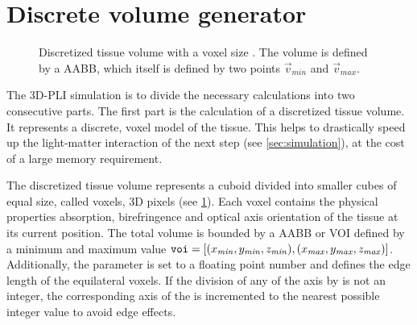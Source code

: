 \section{Discrete volume generator}
\label{sec:dv_generator}
%
\begin{figure}[!t]
\centering
\setlength{\tikzwidth}{0.5\textwidth}
\caption{Discretized tissue volume with a voxel size \voxelsize. The volume is defined by a \ac{AABB}, which itself is defined by two points $\vec{v}_\mathit{min}$ and $\vec{v}_\mathit{max}$.}
\label{fig:discVol}
\end{figure}
%
The \ac{3D-PLI} simulation is to divide the necessary calculations into two consecutive parts. The first part is the calculation of a discretized tissue volume.
It represents a discrete, voxel model of the tissue.
This helps to drastically speed up the light-matter interaction of the next step (see \cref{sec:simulation}), at the cost of a large memory requirement.
\par
%
The discretized tissue volume represents a cuboid divided into smaller cubes of equal size, called voxels, \ie{} 3D pixels (see \cref{fig:discVol}).
Each voxel contains the physical properties absorption, birefringence and optical axis orientation of the tissue at its current position.
The total volume is bounded by a \ac{AABB} or \ac{VOI} defined by a minimum and maximum value $\texttt{voi} = [(x_{\mathit{min}}, y_{\mathit{min}}, z_{\mathit{min}}), (x_{\mathit{max}}, y_{\mathit{max}}, z_{\mathit{max}})]$.
Additionally, the parameter \Voxelsize{} \voxelsize{} is set to a floating point number and defines the edge length of the equilateral voxels.
If the division of any of the \voi{} axis by \voxelsize{} is not an integer, the corresponding axis of the \voi{} is incremented to the nearest possible integer value to avoid edge effects.
%
%
%
